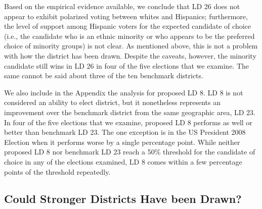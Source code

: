 \documentclass[12pt]{article}
\begin{document}
Based on the empirical evidence available, we conclude that LD 26 does
not appear to exhibit polarized voting between whites and Hispanics;
furthermore, the level of support among Hispanic voters for the
expected candidate of choice (i.e., the candidate who is an ethnic
minority or who appears to be the preferred choice of minority groups)
is not clear. As mentioned above, this is not a problem with how the
district has been drawn. Despite the caveats, however, the minority
candidate still wins in LD 26 in four of the five elections that we
examine. The same cannot be said about three of the ten benchmark
districts.

We also include in the Appendix the analysis for proposed LD 8. LD 8
is not considered an ability to elect district, but it nonetheless
represents an improvement over the benchmark district from the same
geographic area, LD 23. In four of the five elections that we examine,
proposed LD 8 performs as well or better than benchmark LD 23. The one
exception is in the US President 2008 Election when it performs worse
by a single percentage point. While neither proposed LD 8 nor
benchmark LD 23 reach a 50\% threshold for the candidate of choice in
any of the elections examined, LD 8 comes within a few percentage
points of the threshold repeatedly.


\subsection{Could Stronger Districts Have been Drawn?}
\end{document}
